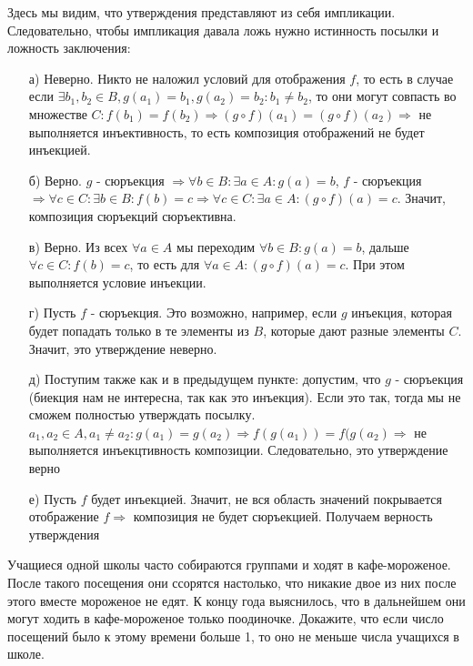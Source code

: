 \documentclass{article}
\begin{document}
\begin{solution}[5]
Здесь мы видим, что утверждения представляют из себя импликации. Следовательно, чтобы импликация давала ложь нужно истинность посылки и ложность заключения:
\begin{enumerate}
\item[а)] Неверно. Никто не наложил условий для отображения $f$, то есть в случае если $\exists b_1, b_2 \in B, g(a_1) = b_1, g(a_2) = b_2: b_1 \neq b_2$, то они могут совпасть во множестве $C: f(b_1) = f(b_2) \Rightarrow (g \circ f)(a_1) = (g \circ f)(a_2) \Rightarrow$ не выполняется инъективность, то есть композиция отображений не будет инъекцией.
\item[б)] Верно. $g$ - сюръекция $\Rightarrow \forall b \in B: \exists a \in A: g(a) = b$, $f$ - сюръекция $\Rightarrow \forall c \in C: \exists b \in B: f(b) = c \Rightarrow \forall c \in C: \exists a \in A: (g \circ f)(a) = c$. Значит, композиция сюръекций сюръективна.
\item[в)] Верно. Из всех $\forall a \in A$ мы переходим $\forall b \in B: g(a) = b$, дальше $\forall c \in C: f(b) = c$, то есть для $\forall a \in A: (g \circ f)(a) = c$. При этом выполняется условие инъекции.
\item[г)] Пусть $f$ - сюръекция. Это возможно, например, если $g$ инъекция, которая будет попадать только в те элементы из $B$, которые дают разные элементы $C$. Значит, это утверждение неверно.
\item[д)] Поступим также как и в предыдущем пункте: допустим, что $g$ - сюръекция (биекция нам не интересна, так как это инъекция). Если это так, тогда мы не сможем полностью утверждать посылку. $a_1, a_2 \in A, a_1 \neq a_2: g(a_1) = g(a_2) \Rightarrow f(g(a_1)) = f(g(a_2) \Rightarrow$ не выполняется инъекцтивность композиции. Следовательно, это утверждение верно
\item[е)] Пусть $f$ будет инъекцией. Значит, не вся область значений покрывается отображение $f \Rightarrow$ композиция не будет сюръекцией. Получаем верность утверждения
\end{enumerate}
\end{solution}
\begin{task}[3]
Учащиеся одной школы часто собираются группами и ходят в кафе-мороженое. После такого посещения они ссорятся настолько, что никакие двое из них после этого вместе мороженое не едят. К концу года выяснилось, что в дальнейшем они могут ходить в кафе-мороженое только поодиночке. Докажите, что если число посещений было к этому времени больше 1, то оно не меньше числа учащихся в школе.
\end{task}
\end{document}
